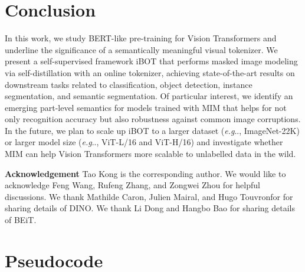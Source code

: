 \documentclass{article} \usepackage{iclr2022_conference,times}
\makeatletter
\def\ourmethod{{iBOT}\xspace}
\DeclareRobustCommand\onedot{\futurelet\@let@token\@onedot}
\def\@onedot{\ifx\@let@token.\else.\null\fi\xspace}
\def\eg{\emph{e.g}\onedot} \def\Eg{\emph{E.g}\onedot}
\makeatother
\begin{document}
\section{Conclusion}
In this work, we study BERT-like pre-training for Vision Transformers and underline the significance of a semantically meaningful visual tokenizer.
We present a self-supervised framework \ourmethod that performs masked image modeling via self-distillation with an online tokenizer, achieving state-of-the-art results on downstream tasks related to classification, object detection, instance segmentation, and semantic segmentation.
Of particular interest, we identify an emerging part-level semantics for models trained with MIM that helps for not only recognition accuracy but also robustness against common image corruptions.
In the future, we plan to scale up \ourmethod to a larger dataset (\eg, ImageNet-22K) or larger model size (\eg, ViT-L/16 and ViT-H/16) and investigate whether MIM can help Vision Transformers more scalable to unlabelled data in the wild.

\textbf{Acknowledgement} Tao Kong is the corresponding author. We would like to acknowledge Feng Wang, Rufeng Zhang, and Zongwei Zhou for helpful discussions. We thank Mathilde Caron, Julien Mairal, and Hugo Touvronfor for sharing details of DINO. We thank Li Dong and Hangbo Bao for sharing details of BEiT. 












\newpage
\appendix

\section{Pseudocode}
\label{sec:code}
\end{document}
